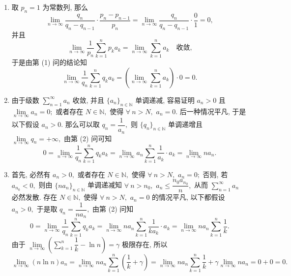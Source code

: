 \begin{solution}
\begin{enumerate}
\item 取 $p_n = 1$ 为常数列, 那么
\[\lim\limits_{n\to\infty} \dfrac{q_n}{q_n - q_{n-1}} \cdot \dfrac{p_n - p_{n-1}}{p_n} = \lim\limits_{n\to\infty} \dfrac{q_n}{q_n - q_{n-1}} \cdot \dfrac{0}{1} = 0,\]
并且
\[\lim\limits_{n \to \infty} \dfrac{1}{p_n} \sum\limits_{k=1}^n p_ka_k = \lim\limits_{n \to \infty} \sum\limits_{k=1}^n a_k \quad \text{收敛,}\]
于是由第 (1) 问的结论知
\begin{equation*}
\lim\limits_{n \to \infty} \dfrac{1}{q_n} \sum\limits_{k=1}^n q_ka_k = \left( \lim\limits_{n \to \infty} \sum\limits_{k=1}^n a_k \right) \cdot 0 = 0.
\end{equation*}

\item 由于级数 $\sum\limits_{n=1}^\infty a_n$ 收敛, 并且 $\{ a_n \}_{n \in \mathbb{N}}$ 单调递减, 容易证明 $a_n > 0$ 且 $\lim\limits_{n\to\infty} a_n = 0;$ 或者存在 $N \in \mathbb{N},$ 使得 $\forall ~ n > N,$ $a_n = 0.$ 后一种情况平凡, 于是以下假设 $a_n > 0.$ 那么可以取 $q_n = \dfrac{1}{a_n},$ 则 $\{ q_n \}_{n \in \mathbb{N}}$ 单调递增且 $\lim\limits_{n \to \infty} q_n = +\infty,$ 由第 (2) 问可知
\begin{equation*}
0 = \lim\limits_{n \to \infty} \dfrac{1}{q_n} \sum\limits_{k=1}^n q_ka_k = \lim\limits_{n \to \infty} a_n \sum\limits_{k=1}^n \dfrac{1}{a_k} \cdot a_k = \lim\limits_{n \to \infty} n a_n.
\end{equation*}

\item 首先, 必然有 $a_n > 0,$ 或者存在 $N \in \mathbb{N},$ 使得 $\forall ~ n > N,$ $a_n = 0;$ 否则, 若 $a_{n_0} < 0,$ 则由 $\{ na_n \}_{n \in \mathbb{N}}$ 单调递减知 $\forall ~ n > n_0,$ $a_n \leqslant \dfrac{n_0 a_{n_0}}{n},$ 从而 $\sum\limits_{n=1}^\infty a_n$ 必然发散. 存在 $N \in \mathbb{N},$ 使得 $\forall ~ n > N,$ $a_n = 0$ 的情况平凡, 以下都假设 $a_n > 0,$ 于是取 $q_n = \dfrac{1}{n a_n},$ 由第 (2) 问知
\begin{equation*}
0 = \lim\limits_{n \to \infty} \dfrac{1}{q_n} \sum\limits_{k=1}^n q_ka_k = \lim\limits_{n \to \infty} n a_n \sum\limits_{k=1}^n \dfrac{1}{k a_k} \cdot a_k = \lim\limits_{n \to \infty} n a_n \sum\limits_{k=1}^n \dfrac{1}{k}.
\end{equation*}
由于 $\lim\limits_{n \to \infty} \left( \sum\limits_{k=1}^n \dfrac{1}{k} - \ln n \right) = \gamma$ 极限存在, 所以
\begin{equation*}
\lim_{n \to \infty} (n\ln n)a_n = \lim_{n \to \infty} n a_n \sum\limits_{k=1}^n \left( \dfrac{1}{k} + \gamma \right) = \lim_{n \to \infty} n a_n \sum\limits_{k=1}^n \dfrac{1}{k} + \gamma \lim_{n \to \infty} n a_n = 0 + 0 = 0.
\end{equation*}
\end{enumerate}
\end{solution}



